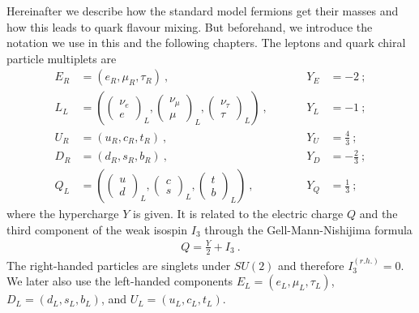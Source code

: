 Hereinafter we describe how the standard model fermions get their masses and how this leads to quark flavour mixing. But beforehand, we introduce the notation we use in this and the following chapters. The leptons and quark chiral particle multiplets are
\begin{align}
	E_R &= (e_R,\mu_R,\tau_R) \ , &&\quad &Y_E &= -2 \ ; \\
	L_L &= \left(\begin{pmatrix} \nu_e \\ e \end{pmatrix}_L,
	\begin{pmatrix} \nu_\mu \\ \mu \end{pmatrix}_L,
	\begin{pmatrix} \nu_\tau \\ \tau \end{pmatrix}_L\right) \ , &&\quad &Y_L &= -1 \ ; \\
	U_R &= (u_R,c_R,t_R) \ , &&\quad &Y_U &= \frac{4}{3} \ ; \\
	D_R &= (d_R,s_R,b_R) \ , &&\quad &Y_D &= -\frac{2}{3} \ ; \\
	Q_L &= \left(\begin{pmatrix} u \\ d \end{pmatrix}_L,
	\begin{pmatrix} c \\ s \end{pmatrix}_L,
	\begin{pmatrix} t \\ b \end{pmatrix}_L\right) \ , &&\quad &Y_Q &= \frac{1}{3} \ ;
\end{align}
where the hypercharge $Y$ is given. It is related to the electric charge $Q$ and the third component of the weak isospin $I_3$ through the Gell-Mann-Nishijima formula \cite[Chapter 10.7]{Griffiths}
\begin{align}\label{eq:GellMann}
	Q = \frac{Y}{2} + I_3 \ .
\end{align}
The right-handed particles are singlets under $SU(2)$ and therefore $I^{(r.h.)}_3=0$. We later also use the left-handed components $E_L = (e_L,\mu_L,\tau_L)$, $D_L = (d_L,s_L,b_L)$, and $U_L = (u_L,c_L,t_L)$.


